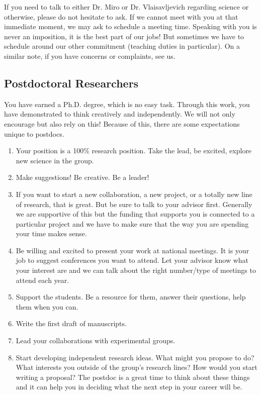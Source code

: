 \documentclass[letterpaper]{article}
\begin{document}
If you need to talk to either Dr. Miro or Dr. Vlaisavljevich regarding science or otherwise, please do not hesitate to ask. If we cannot meet with you at that immediate moment, we may ask to schedule a meeting time. Speaking with you is never an imposition, it is the best part of our jobs! But sometimes we have to schedule around our other commitment (teaching duties in particular). On a similar note, if you have concerns or complaints, see us.

\subsection*{Postdoctoral Researchers}
You have earned a Ph.D. degree, which is no easy task. Through this work, you have demonstrated to think creatively and independently. We will not only encourage but also rely on this! Because of this, there are some expectations unique to postdocs. 

\begin{enumerate} 
\item Your position is a 100\% research position. Take the lead, be excited, explore new science in the group.
\item Make suggestions! Be creative. Be a leader!
\item If you want to start a new collaboration, a new project, or a totally new line of research, that is great. But be sure to talk to your advisor first. Generally we are supportive of this but the funding that supports you is connected to a particular project and we have to make sure that the way you are spending your time makes sense.
\item Be willing and excited to present your work at national meetings. It is your job to suggest conferences you want to attend. Let your advisor know what your interest are and we can talk about the right number/type of meetings to attend each year.
\item Support the students. Be a resource for them, answer their questions, help them when you can.
\item Write the first draft of manuscripts.
\item Lead your collaborations with experimental groups.
\item Start developing independent research ideas. What might you propose to do? What interests you outside of the group's research lines? How would you start writing a proposal? The postdoc is a great time to think about these things and it can help you in deciding what the next step in your career will be. 
\end{enumerate}
\end{document}
